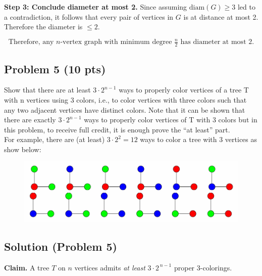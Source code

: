 \documentclass[12pt]{article}
\begin{document}
\bigskip
\textbf{Step 3: Conclude diameter at most 2.}
Since assuming \(\mathrm{diam}(G)\ge3\) led to a contradiction, it follows that every pair of vertices in \(G\) is at distance at most 2. Therefore the diameter is \(\le2\).

\[
\boxed{\text{Therefore, any }n\text{-vertex graph with minimum degree }\tfrac{n}{2}
\text{ has diameter at most }2.}
\]

\subsection*{Problem 5 (10 pts)}
Show that there are at least $3\cdot2^{n-1}$ ways to properly color vertices of a tree T with n vertices using 3 colors, i.e., to color vertices with three colors such that any two adjacent vertices have  distinct colors. Note that it can be shown that there are exactly $3\cdot2^{n-1}$ ways to properly color vertices of T with 3 colors but in this problem, to receive full credit, it is enough prove the “at least” part.\\
For example, there are (at least) $3\cdot2^2 = 12$ ways to color a tree with 3 vertices as show below:

\begin{figure}[H]
    \centering
    \includegraphics[width=0.8\linewidth]{P5.png}
    \label{fig:3-color-graph}
\end{figure}

\subsection*{Solution (Problem 5)}

\noindent
\textbf{Claim.} A tree \(T\) on \(n\) vertices admits \emph{at least} \(3 \cdot 2^{\,n-1}\) proper 3-colorings.
\end{document}

